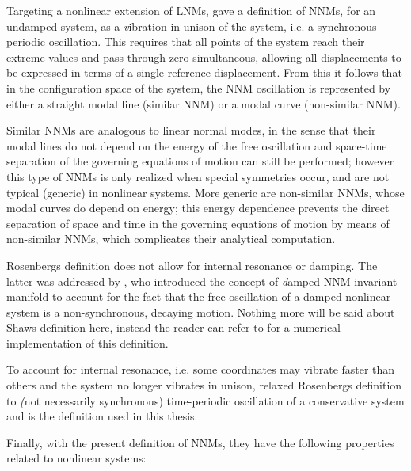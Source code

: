 Targeting a nonlinear extension of LNMs, \autocite{rosenberg1966a} gave a
definition of NNMs, for an undamped system, as a {\textit vibration in unison of the
  system}, i.e. a synchronous periodic oscillation. This requires that all
points of the system reach their extreme values and pass through zero
simultaneous, allowing all displacements to be expressed in terms of a single
reference displacement.
From this it follows that in the configuration space of the system, the NNM
oscillation is represented by either a straight modal line (similar NNM) or a
modal curve (non-similar NNM).

Similar NNMs are analogous to linear normal modes, in the sense that their modal
lines do not depend on the energy of the free oscillation and space-time
separation of the governing equations of motion can still be performed; however
this type of NNMs is only realized when special symmetries occur, and are not
typical (generic) in nonlinear systems. More generic are non-similar NNMs, whose
modal curves do depend on energy; this energy dependence prevents the direct
separation of space and time in the governing equations of motion by means of
non-similar NNMs, which complicates their analytical computation.


Rosenbergs definition does not allow for internal resonance or damping.  The
latter was addressed by \autocite{shaw1993a}, who introduced the concept of {\textit
  damped NNM invariant manifold} to account for the fact that the free
oscillation of a damped nonlinear system is a non-synchronous, decaying motion.
Nothing more will be said about Shaws definition here, instead the reader can
refer to \autocite{renson2014_phd} for a numerical implementation of this
definition.

To account for internal resonance, i.e. some coordinates may vibrate faster than
others and the system no longer vibrates in unison, \autocite{kerschen2009a}
relaxed Rosenbergs definition to {\textit (not necessarily synchronous)
  time-periodic oscillation of a conservative system} and is the definition used
in this thesis.


Finally, with the present definition of NNMs, they have the following properties
related to nonlinear systems:

